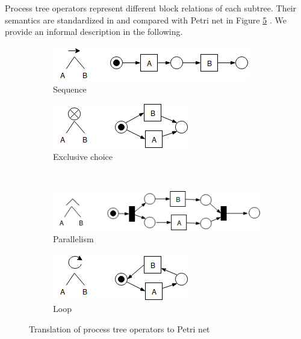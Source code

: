Process tree operators represent different block relations of each subtree. Their semantics are standardized in  \cite{vanderAalst:2016:PMD:2948762, Buijs2012OnTR} and compared with Petri net in Figure \ref{fig:pn_pt_correspondings} \cite{Buijs2012OnTR}. We provide an informal description in the following.
\begin{figure}[!h]
	\centering
	\begin{subfigure}[b]{0.45\textwidth}
		\centering
		\includegraphics[width=\linewidth]{figures/preliminary/PT_PN_corresponding_01_seq_PN.png}
		\caption{Sequence}
		\label{fig:pt_pn_seq}
	\end{subfigure}%
	\quad
	\begin{subfigure}[b]{0.45\textwidth}
		\centering
		\includegraphics[width=\linewidth]{figures/preliminary/PT_PN_corresponding_02_xor_PN.png}
		\caption{Exclusive choice}
		\label{fig:pt_pn_xor}
	\end{subfigure}%
	\\ %
	\begin{subfigure}[b]{0.45\textwidth}
		\centering
		\includegraphics[width=\linewidth]{figures/preliminary/PT_PN_corresponding_03_and_PN.png}
		\caption{ Parallelism }
		\label{fig:pt_pn_and}
	\end{subfigure}%
	\quad
	\begin{subfigure}[b]{0.45\textwidth}
		\centering
		\includegraphics[width=\linewidth]{figures/preliminary/PT_PN_corresponding_04_loop_PN.png}
		\caption{Loop}
		\label{fig:pt_pn_loop}
	\end{subfigure}%
	\caption{Translation of process tree operators to Petri net}
	\label{fig:pn_pt_correspondings}
\end{figure}
